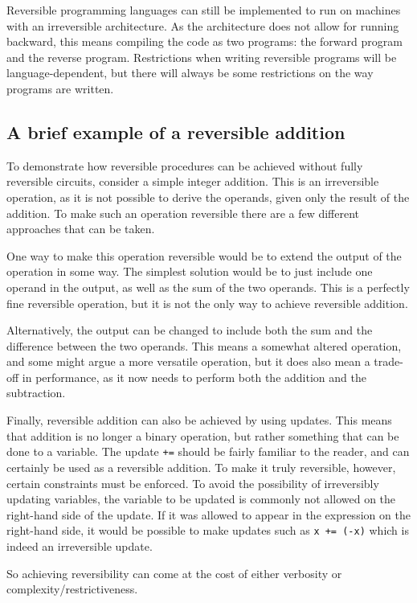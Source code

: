 Reversible programming languages can still be implemented to run on machines with an irreversible architecture. As the architecture does not allow for running backward, this means compiling the code as two programs: the forward program and the reverse program. Restrictions when writing reversible programs will be language-dependent, but there will always be some restrictions on the way programs are written.
\subsection{A brief example of a reversible addition}
To demonstrate how reversible procedures can be achieved without fully reversible circuits, consider a simple integer addition. This is an irreversible operation, as it is not possible to derive the operands, given only the result of the addition. To make such an operation reversible there are a few different approaches that can be taken.

One way to make this operation reversible would be to extend the output of the operation in some way. The simplest solution would be to just include one operand in the output, as well as the sum of the two operands. This is a perfectly fine reversible operation, but it is not the only way to achieve reversible addition.

Alternatively, the output can be changed to include both the sum and the difference between the two operands. This means a somewhat altered operation, and some might argue a more versatile operation, but it does also mean a trade-off in performance, as it now needs to perform both the addition and the subtraction.

Finally, reversible addition can also be achieved by using updates. This means that addition is no longer a binary operation, but rather something that can be done to a variable. The update \texttt{+=} should be fairly familiar to the reader, and can certainly be used as a reversible addition. To make it truly reversible, however, certain constraints must be enforced. To avoid the possibility of irreversibly updating variables, the variable to be updated is commonly not allowed on the right-hand side of the update. If it was allowed to appear in the expression on the right-hand side, it would be possible to make updates such as \texttt{x += (-x)} which is indeed an irreversible update.

So achieving reversibility can come at the cost of either verbosity or complexity/restrictiveness.
